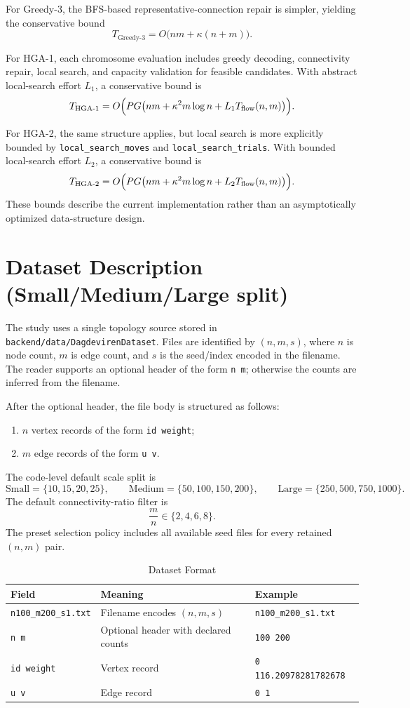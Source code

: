 \documentclass[11pt]{article}
\begin{document}
For Greedy-3, the BFS-based representative-connection repair is simpler, yielding the conservative bound
\[
T_{\text{Greedy-3}}=O\bigl(nm+\kappa(n+m)\bigr).
\]

For HGA-1, each chromosome evaluation includes greedy decoding, connectivity repair, local search, and capacity validation for feasible candidates. With abstract local-search effort \(L_1\), a conservative bound is
\[
T_{\text{HGA-1}}=O\Bigl(PG\bigl(nm+\kappa^2m\log n+L_1T_{\mathrm{flow}}(n,m)\bigr)\Bigr).
\]

For HGA-2, the same structure applies, but local search is more explicitly bounded by \texttt{local\_search\_moves} and \texttt{local\_search\_trials}. With bounded local-search effort \(L_2\), a conservative bound is
\[
T_{\text{HGA-2}}=O\Bigl(PG\bigl(nm+\kappa^2m\log n+L_2T_{\mathrm{flow}}(n,m)\bigr)\Bigr).
\]
These bounds describe the current implementation rather than an asymptotically optimized data-structure design.

\section{Dataset Description (Small/Medium/Large split)}

The study uses a single topology source stored in \texttt{backend/data/DagdevirenDataset}. Files are identified by \((n,m,s)\), where \(n\) is node count, \(m\) is edge count, and \(s\) is the seed/index encoded in the filename. The reader supports an optional header of the form \texttt{n m}; otherwise the counts are inferred from the filename.

After the optional header, the file body is structured as follows:
\begin{enumerate}
    \item \(n\) vertex records of the form \texttt{id weight};
    \item \(m\) edge records of the form \texttt{u v}.
\end{enumerate}

The code-level default scale split is
\[
\text{Small}=\{10,15,20,25\},\qquad
\text{Medium}=\{50,100,150,200\},\qquad
\text{Large}=\{250,500,750,1000\}.
\]
The default connectivity-ratio filter is
\[
\frac{m}{n}\in\{2,4,6,8\}.
\]
The preset selection policy includes all available seed files for every retained \((n,m)\) pair.

\begin{table}[h]
\centering
\caption{Dataset Format}
\label{tab:dataset-format}
\begin{tabular}{lll}
\toprule
Field & Meaning & Example \\
\midrule
\texttt{n100\_m200\_s1.txt} & Filename encodes \((n,m,s)\) & \texttt{n100\_m200\_s1.txt} \\
\texttt{n m} & Optional header with declared counts & \texttt{100 200} \\
\texttt{id weight} & Vertex record & \texttt{0 116.20978281782678} \\
\texttt{u v} & Edge record & \texttt{0 1} \\
\bottomrule
\end{tabular}
\end{table}
\end{document}
